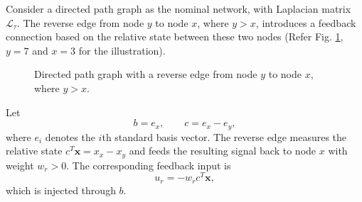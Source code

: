 \documentclass[11pt,a4paper]{article}
\begin{document}
Consider a directed path graph as the nominal network, with Laplacian matrix $\mathcal{L}_{\tau}$. The reverse edge from node $y$ to node $x$, where $y>x$, introduces a feedback connection based on the relative state between these two nodes (Refer Fig. \ref{fig:directed_path_reverse_edge}, $y=7$ and $x=3$ for the illustration). 


\begin{figure}[H]
	\centering
	\caption{Directed path graph with a reverse edge from node $y$ to node $x$, where $y>x$.}
	\label{fig:directed_path_reverse_edge}
\end{figure}


Let
\[
b=e_x,\qquad c=e_x-e_y,
\]
where $e_i$ denotes the $i$th standard basis vector. The reverse edge measures the relative state $c^T\boldsymbol{x}=x_x-x_y$ and feeds the resulting signal back to node $x$ with weight $w_r>0$. The corresponding feedback input is
\[
u_r=-w_r c^T\boldsymbol{x},
\]
which is injected through $b$.
\end{document}
